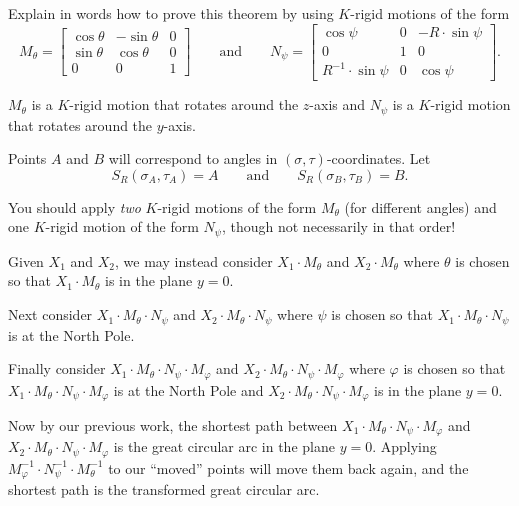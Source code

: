 \documentclass[newpage,hints,handout,noauthor,nooutcomes,12pt]{ximera}
\begin{document}
\begin{problem} %
  Explain in words how to prove this theorem by using $K$-rigid
  motions of the form
  \[
  M_\theta=
  \begin{bmatrix}
    \cos\theta & -\sin\theta & 0\\
    \sin\theta & \cos\theta & 0\\
    0 & 0 & 1
  \end{bmatrix}
  \qquad\text{and}\qquad
  N_\psi=
  \begin{bmatrix}
    \cos\psi & 0 & -R\cdot\sin\psi\\
    0 & 1 & 0\\
    R^{-1}\cdot\sin\psi & 0 & \cos\psi
  \end{bmatrix}.
  \]
  \begin{hint}
    $M_\theta$ is a $K$-rigid motion that rotates around the $z$-axis and
    $N_\psi$ is a $K$-rigid motion that rotates around the $y$-axis.
  \end{hint}
  \begin{hint}
    Points $A$ and $B$ will correspond to angles in
    $(\sigma,\tau)$-coordinates. Let
    \[
    S_R(\sigma_A,\tau_A) = A\qquad\text{and}\qquad S_R(\sigma_B,\tau_B) = B.
    \]
  \end{hint}
  \begin{hint}
    You should apply \textit{two} $K$-rigid motions of the form
    $M_\theta$ (for different angles) and one $K$-rigid motion of the
    form $N_\psi$, though not necessarily in that order!
  \end{hint}
  \begin{freeResponse}
    Given $X_1$ and $X_2$, we may instead consider $X_1\cdot M_\theta$
    and $X_2\cdot M_\theta$ where $\theta$ is chosen so that $X_1\cdot
    M_\theta$ is in the plane $y=0$.

    Next consider $X_1\cdot M_\theta\cdot N_\psi$ and $X_2\cdot
    M_\theta\cdot N_\psi$ where $\psi$ is chosen so that $X_1\cdot
    M_\theta\cdot N_\psi$ is at the North Pole.

    Finally consider $X_1\cdot M_\theta\cdot N_\psi\cdot M_\varphi$
    and $X_2\cdot M_\theta\cdot N_\psi\cdot M_\varphi$ where $\varphi$
    is chosen so that $X_1\cdot M_\theta\cdot N_\psi\cdot M_\varphi$
    is at the North Pole and $X_2\cdot M_\theta\cdot N_\psi\cdot
    M_\varphi$ is in the plane $y=0$.

    Now by our previous work, the shortest path between $X_1\cdot
    M_\theta\cdot N_\psi\cdot M_\varphi$ and $X_2\cdot M_\theta\cdot
    N_\psi\cdot M_\varphi$ is the great circular arc in the plane
    $y=0$. Applying $M_\varphi^{-1}\cdot N_\psi^{-1}\cdot
    M_\theta^{-1}$ to our ``moved'' points will move them back again,
    and the shortest path is the transformed great circular arc.
  \end{freeResponse}
\end{problem}
\end{document}
